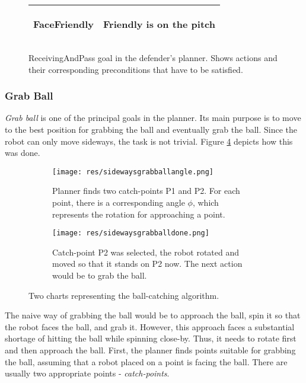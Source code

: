 \begin{center}
\begin{figure}[H]
\begin{tabular}{ | l | p{110mm} | }
FaceFriendly &
\begin{compactitem}
\item Friendly is on the pitch
\end{compactitem}  \\ \hline
\end{tabular}
\par
\bigskip

\caption{ReceivingAndPass goal in the defender's planner. Shows actions and their corresponding preconditions that have to be satisfied.}

	\label{fig:receiveandpass}
\end{figure}
\end{center}

\pagebreak
\subsubsection{Grab Ball}

\emph{Grab ball} is one of the principal goals in the planner. Its main purpose is to move to the best position for grabbing the ball and eventually grab the ball. Since the robot can only move sideways, the task is not trivial. Figure \ref{fig:sidewaysgrabball} depicts how this was done.

\begin{figure}[H]
	\begin{center}
	\begin{subfigure}{0.5\textwidth}
  		\texttt{[image: res/sidewaysgrabballangle.png]}
  		\caption{Planner finds two catch-points P1 and P2. For each point, there is a corresponding angle $\phi$, which represents the rotation for approaching a point.}
  		\label{fig:sidewaysgrabballangle}
	\end{subfigure}%
	\begin{subfigure}{0.5\textwidth}
  		\texttt{[image: res/sidewaysgrabballdone.png]}
  		\caption{Catch-point P2 was selected, the robot rotated and moved so that it stands on P2 now. The next action would be to grab the ball. }
  		\label{fig:sidewaysgrabballdone}
	\end{subfigure}%
	
	\caption{Two charts representing the ball-catching algorithm. }
	\label{fig:sidewaysgrabball}
	\end{center}
\end{figure}


The naive way of grabbing the ball would be to approach the ball, spin it so that the robot faces the ball, and grab it. However, this approach faces a substantial shortage of hitting the ball while spinning close-by. Thus, it needs to rotate first and then approach the ball. First, the planner finds points suitable for grabbing the ball, assuming that a robot placed on a point is facing the ball. There are usually two appropriate points - \emph{catch-points}. 

